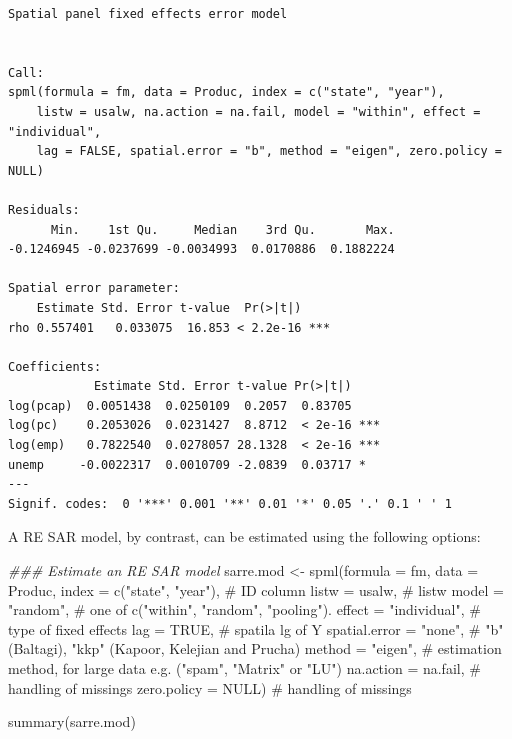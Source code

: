 \documentclass[
  letterpaper,
]{scrbook}
\newenvironment{Shaded}{\begin{snugshade}}{\end{snugshade}}
\newcommand{\AttributeTok}[1]{\textcolor[rgb]{0.40,0.45,0.13}{#1}}
\newcommand{\CommentTok}[1]{\textcolor[rgb]{0.37,0.37,0.37}{#1}}
\newcommand{\ConstantTok}[1]{\textcolor[rgb]{0.56,0.35,0.01}{#1}}
\newcommand{\DocumentationTok}[1]{\textcolor[rgb]{0.37,0.37,0.37}{\textit{#1}}}
\newcommand{\FunctionTok}[1]{\textcolor[rgb]{0.28,0.35,0.67}{#1}}
\newcommand{\NormalTok}[1]{\textcolor[rgb]{0.00,0.23,0.31}{#1}}
\newcommand{\OtherTok}[1]{\textcolor[rgb]{0.00,0.23,0.31}{#1}}
\newcommand{\StringTok}[1]{\textcolor[rgb]{0.13,0.47,0.30}{#1}}
\begin{document}
\begin{verbatim}
Spatial panel fixed effects error model
 

Call:
spml(formula = fm, data = Produc, index = c("state", "year"), 
    listw = usalw, na.action = na.fail, model = "within", effect = "individual", 
    lag = FALSE, spatial.error = "b", method = "eigen", zero.policy = NULL)

Residuals:
      Min.    1st Qu.     Median    3rd Qu.       Max. 
-0.1246945 -0.0237699 -0.0034993  0.0170886  0.1882224 

Spatial error parameter:
    Estimate Std. Error t-value  Pr(>|t|)    
rho 0.557401   0.033075  16.853 < 2.2e-16 ***

Coefficients:
            Estimate Std. Error t-value Pr(>|t|)    
log(pcap)  0.0051438  0.0250109  0.2057  0.83705    
log(pc)    0.2053026  0.0231427  8.8712  < 2e-16 ***
log(emp)   0.7822540  0.0278057 28.1328  < 2e-16 ***
unemp     -0.0022317  0.0010709 -2.0839  0.03717 *  
---
Signif. codes:  0 '***' 0.001 '**' 0.01 '*' 0.05 '.' 0.1 ' ' 1
\end{verbatim}

A RE SAR model, by contrast, can be estimated using the following
options:

\begin{Shaded}
\begin{Highlighting}[]
\DocumentationTok{\#\#\# Estimate an RE SAR model}
\NormalTok{sarre.mod }\OtherTok{\textless{}{-}} \FunctionTok{spml}\NormalTok{(}\AttributeTok{formula =}\NormalTok{ fm, }\AttributeTok{data =}\NormalTok{ Produc, }
                  \AttributeTok{index =} \FunctionTok{c}\NormalTok{(}\StringTok{"state"}\NormalTok{, }\StringTok{"year"}\NormalTok{),  }\CommentTok{\# ID column}
                  \AttributeTok{listw =}\NormalTok{ usalw,          }\CommentTok{\# listw}
                  \AttributeTok{model =} \StringTok{"random"}\NormalTok{,       }\CommentTok{\# one of c("within", "random", "pooling").}
                  \AttributeTok{effect =} \StringTok{"individual"}\NormalTok{,  }\CommentTok{\# type of fixed effects}
                  \AttributeTok{lag =} \ConstantTok{TRUE}\NormalTok{,             }\CommentTok{\# spatila lg of Y}
                  \AttributeTok{spatial.error =} \StringTok{"none"}\NormalTok{, }\CommentTok{\# "b" (Baltagi), "kkp" (Kapoor, Kelejian and Prucha)}
                  \AttributeTok{method =} \StringTok{"eigen"}\NormalTok{,       }\CommentTok{\# estimation method, for large data e.g. ("spam", "Matrix" or "LU")}
                  \AttributeTok{na.action =}\NormalTok{ na.fail,    }\CommentTok{\# handling of missings}
                  \AttributeTok{zero.policy =} \ConstantTok{NULL}\NormalTok{)     }\CommentTok{\# handling of missings}

\FunctionTok{summary}\NormalTok{(sarre.mod)}
\end{Highlighting}
\end{Shaded}
\end{document}

